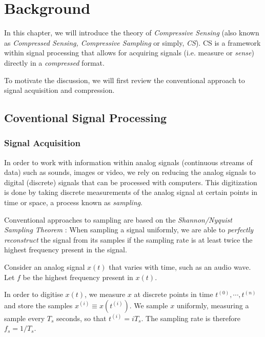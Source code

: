 \chapter{Background}
\label{ch:cs}
In this chapter, we will introduce the theory of \emph{Compressive Sensing} (also known as \emph{Compressed Sensing, Compressive Sampling} or simply, \emph{CS}).
CS is a framework within signal processing that allows for acquiring signals (i.e. measure or \emph{sense}) directly in a \emph{compressed} format.

To motivate the discussion, we will first review the conventional approach to signal acquisition and compression.

\section{Coventional Signal Processing}
\subsection{Signal Acquisition}
In order to work with information within analog signals (continuous streams of data) such as sounds, images or video, we rely on reducing the analog signals to digital (discrete) signals that can be processed with computers.
This digitization is done by taking discrete measurements of the analog signal at certain points in time or space, a process known as \emph{sampling}.

Conventional approaches to sampling are based on the \emph{Shannon/Nyquist Sampling Theorem} \cite{shannon1949}:
When sampling a signal uniformly, we are able to \emph{perfectly reconstruct} the signal from its samples if the sampling rate is at least twice the highest frequency present in the signal.

Consider an analog signal $x(t)$ that varies with time, such as an audio wave.
Let $f$ be the highest frequency present in $x(t)$.

In order to digitise $x(t)$, we measure $x$ at discrete points in time $t^{(0)}, \cdots, t^{(n)}$ and store the samples $x^{(i)} \equiv x(t^{(i)})$.
We sample $x$ uniformly, measuring a sample every $T_s$ seconds, so that $t^{(i)} = iT_s$.
The sampling rate is therefore $f_s = 1/T_s$.

